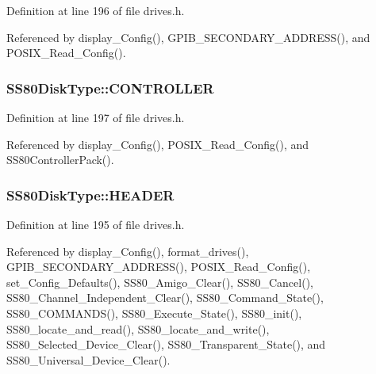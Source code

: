 Definition at line 196 of file drives.\+h.



Referenced by display\+\_\+\+Config(), G\+P\+I\+B\+\_\+\+S\+E\+C\+O\+N\+D\+A\+R\+Y\+\_\+\+A\+D\+D\+R\+E\+S\+S(), and P\+O\+S\+I\+X\+\_\+\+Read\+\_\+\+Config().

\subsubsection[{\texorpdfstring{C\+O\+N\+T\+R\+O\+L\+L\+ER}{CONTROLLER}}]{ S\+S80\+Disk\+Type\+::\+C\+O\+N\+T\+R\+O\+L\+L\+ER}\hypertarget{structSS80DiskType_ae9da84cba5786cf755c388eba065c0cd}{}\label{structSS80DiskType_ae9da84cba5786cf755c388eba065c0cd}


Definition at line 197 of file drives.\+h.



Referenced by display\+\_\+\+Config(), P\+O\+S\+I\+X\+\_\+\+Read\+\_\+\+Config(), and S\+S80\+Controller\+Pack().

\subsubsection[{\texorpdfstring{H\+E\+A\+D\+ER}{HEADER}}]{ S\+S80\+Disk\+Type\+::\+H\+E\+A\+D\+ER}\hypertarget{structSS80DiskType_ae66c0130dee8c362743dfdfc41539c3b}{}\label{structSS80DiskType_ae66c0130dee8c362743dfdfc41539c3b}


Definition at line 195 of file drives.\+h.



Referenced by display\+\_\+\+Config(), format\+\_\+drives(), G\+P\+I\+B\+\_\+\+S\+E\+C\+O\+N\+D\+A\+R\+Y\+\_\+\+A\+D\+D\+R\+E\+S\+S(), P\+O\+S\+I\+X\+\_\+\+Read\+\_\+\+Config(), set\+\_\+\+Config\+\_\+\+Defaults(), S\+S80\+\_\+\+Amigo\+\_\+\+Clear(), S\+S80\+\_\+\+Cancel(), S\+S80\+\_\+\+Channel\+\_\+\+Independent\+\_\+\+Clear(), S\+S80\+\_\+\+Command\+\_\+\+State(), S\+S80\+\_\+\+C\+O\+M\+M\+A\+N\+D\+S(), S\+S80\+\_\+\+Execute\+\_\+\+State(), S\+S80\+\_\+init(), S\+S80\+\_\+locate\+\_\+and\+\_\+read(), S\+S80\+\_\+locate\+\_\+and\+\_\+write(), S\+S80\+\_\+\+Selected\+\_\+\+Device\+\_\+\+Clear(), S\+S80\+\_\+\+Transparent\+\_\+\+State(), and S\+S80\+\_\+\+Universal\+\_\+\+Device\+\_\+\+Clear().

